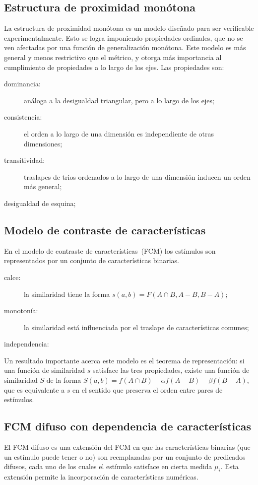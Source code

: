 \documentclass[spanish]{article}
\begin{document}
\subsection{Estructura de proximidad monótona}
La estructura de proximidad monótona es un modelo diseñado para ser verificable experimentalmente.
Esto se logra imponiendo propiedades ordinales, que no se ven afectadas por una función de
generalización monótona.  Este modelo es más general y menos restrictivo que el métrico, y otorga
más importancia al cumplimiento de propiedades a lo largo de los ejes.  Las propiedades son:
\begin{description}
    \item [dominancia:]
        análoga a la desigualdad triangular, pero a lo largo de los ejes;
    \item [consistencia:]
        el orden a lo largo de una dimensión es independiente de otras
        dimensiones;
    \item [transitividad:]
        traslapes de trios ordenados a lo largo de una dimensión inducen un orden más general;
    \item [desigualdad de esquina;]
\end{description}



\subsection{Modelo de contraste de características}
En el modelo de contraste de características~(FCM) los estímulos son representados por un conjunto
de características binarias.
\begin{description}
    \item [calce:] la similaridad tiene la forma $s(a, b) = F(A\cap B, A-B, B-A)$;
    \item [monotonía:] la similaridad está influenciada por el traslape de características comunes;
    \item [independencia:]
\end{description}
Un resultado importante acerca este modelo es el teorema de representación: si una función de
similaridad $s$ satisface las tres propiedades, existe una función de similaridad $S$ de la forma
$S(a, b) = f(A\cap B) - \alpha f(A-B) - \beta f(B-A)$, que es equivalente a $s$ en el sentido que
preserva el orden entre pares de estímulos.  

\subsection{FCM difuso con dependencia de características}
El FCM difuso es una extensión del FCM en que las características binarias (que un estímulo puede
tener o no) son reemplazadas por un conjunto de predicados difusos, cada uno de los cuales el
estímulo satisface en cierta medida $\mu_i$.  Esta extensión permite la incorporación de
características numéricas.
\end{document}
